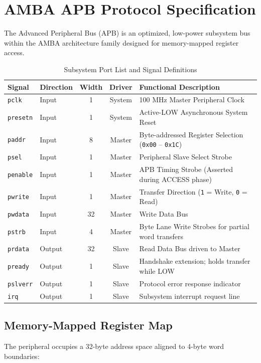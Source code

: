 \documentclass[11pt,a4paper]{article}
\begin{document}
\section{AMBA APB Protocol Specification}

The Advanced Peripheral Bus (APB) is an optimized, low-power subsystem bus within the AMBA architecture family designed for memory-mapped register access.

\begin{table}[h!]
\centering
\small
\renewcommand{\arraystretch}{1.15}
\caption{Subsystem Port List and Signal Definitions}
\label{tab:apb_signals}
\begin{tabular*}{\textwidth}{@{\extracolsep{\fill}}llccl@{}}
\toprule
\textbf{Signal} & \textbf{Direction} & \textbf{Width} & \textbf{Driver} & \textbf{Functional Description} \\
\midrule
\texttt{pclk}      & Input  & 1  & System & 100 MHz Master Peripheral Clock \\
\texttt{presetn}   & Input  & 1  & System & Active-LOW Asynchronous System Reset \\
\texttt{paddr}     & Input  & 8  & Master & Byte-addressed Register Selection (\texttt{0x00} -- \texttt{0x1C}) \\
\texttt{psel}      & Input  & 1  & Master & Peripheral Slave Select Strobe \\
\texttt{penable}   & Input  & 1  & Master & APB Timing Strobe (Asserted during ACCESS phase) \\
\texttt{pwrite}    & Input  & 1  & Master & Transfer Direction (\texttt{1} = Write, \texttt{0} = Read) \\
\texttt{pwdata}    & Input  & 32 & Master & Write Data Bus \\
\texttt{pstrb}     & Input  & 4  & Master & Byte Lane Write Strobes for partial word transfers \\
\texttt{prdata}    & Output & 32 & Slave  & Read Data Bus driven to Master \\
\texttt{pready}    & Output & 1  & Slave  & Handshake extension; holds transfer while LOW \\
\texttt{pslverr}   & Output & 1  & Slave  & Protocol error response indicator \\
\texttt{irq}       & Output & 1  & Slave  & Subsystem interrupt request line \\
\bottomrule
\end{tabular*}
\end{table}

\subsection{Memory-Mapped Register Map}
The peripheral occupies a 32-byte address space aligned to 4-byte word boundaries:
\end{document}
